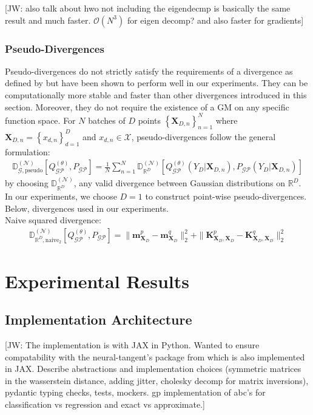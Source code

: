 \documentclass{article}
\newcommand{\jw}[1]{{\color{gray} [JW: #1]}}
\newcommand{\GP}{\operatorname{\mathcal{GP}}}
\numberwithin{equation}{section}
\begin{document}
\jw{also talk about hwo not including the eigendecmp is basically the same result and much faster. $\mathcal{O}(N^3)$ for eigen decomp? and also faster for gradients}

\subsubsection{Pseudo-Divergences}
Pseudo-divergences do not strictly satisfy the requirements of a divergence as defined by \cite{knoblauch2022optimization} but have been shown to perform well in our experiments. They can be computationally more stable and faster than other divergences introduced in this section. Moreover, they do not require the existence of a GM on any specific function space. For $N$ batches of $D$ points $\left\{\mathbf{X}_{D, n}\right\}_{n=1}^N$ where $\mathbf{X}_{D, n}=\left\{x_{d, n}\right\}_{d=1}^D$ and $x_{d, n} \in \mathcal{X}$, pseudo-divergences follow the general formulation:
\begin{align}
    \mathbb{D}_{\mathcal{G}, \text{pseudo}}^{(\mathcal{N})} \left[Q_{\GP}^{(\theta)}, P_{\GP}\right] = \frac{1}{N}\sum_{n=1}^N \mathbb{D}_{\mathbb{R}^D}^{(\mathcal{N})}\left[Q_{\GP}^{(\theta)}(Y_D\vert \mathbf{X}_{D, n}), P_{\GP}(Y_D\vert \mathbf{X}_{D, n})\right]
\end{align}
by choosing $\mathbb{D}_{\mathbb{R}^D}^{(\mathcal{N})}$,  any valid divergence between Gaussian distributions on $\mathbb{R}^D$. In our experiments, we choose $D=1$ to construct point-wise pseudo-divergences. Below, divergences used in our experiments.
\\Naive squared divergence:
\begin{align}
    \mathbb{D}_{\mathbb{R}^D, \text{naive}_2}^{(\mathcal{N})} \left[Q_{\GP}^{(\theta)}, P_{\GP}\right] = \|\mathbf{m}_{\mathbf{X}_D}^p - \mathbf{m}_{\mathbf{X}_D}^q\|_2^2 + \|\mathbf{K}_{\mathbf{X}_D, \mathbf{X}_D}^p - \mathbf{K}_{\mathbf{X}_D, \mathbf{X}_D}^q\|_2^2
\end{align}

\newpage
\section{Experimental Results}
\subsection{Implementation Architecture}

\jw{The implementation is with JAX in Python. Wanted to ensure compatability with the neural-tangent's package from \cite{novak2019neural} which is also implemented in JAX. Describe abstractions and implementation choices (symmetric matrices in the wasserstein distance, adding jitter, cholesky decomp for matrix inversions), pydantic typing checks, tests, mockers. gp implementation of abc's for classification vs regression and exact vs approximate.}
\end{document}
